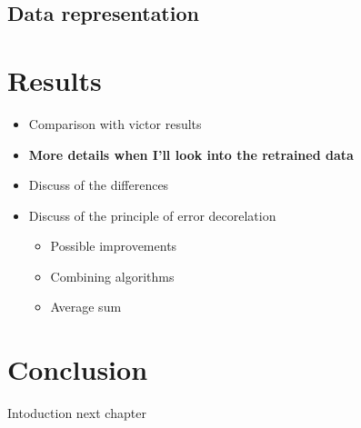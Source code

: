 \subsection{Data representation}
\label{jcnn:data}

\section{Results}

\begin{itemize}
  \item Comparison with victor results
  \item \textbf{More details when I'll look into the retrained data}
  \item Discuss of the differences
  \item Discuss of the principle of error decorelation
    \begin{itemize}
      \item Possible improvements
      \item Combining algorithms
      \item Average sum
    \end{itemize}
\end{itemize}

\section{Conclusion}
Intoduction next chapter
